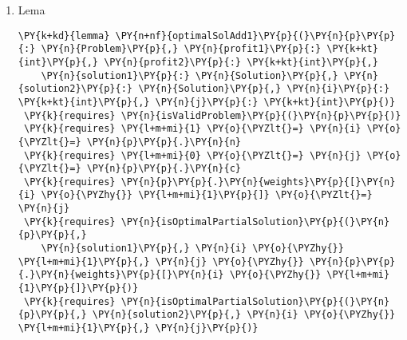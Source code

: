 \begin{sloppypar}
\begin{enumerate}
\begin{Verbatim}[commandchars=\\\{\}]
    \PY{n}{computeGainAllZeros}\PY{p}{(}\PY{n}{p}\PY{p}{,} \PY{n}{solution}\PY{p}{,} \PY{o}{|}\PY{n}{solution}\PY{o}{|} \PY{o}{\PYZhy{}} \PY{l+m+mi}{1}\PY{p}{)}\PY{p}{;}
    \PY{n}{gainCapacity0}\PY{p}{(}\PY{n}{p}\PY{p}{,} \PY{n}{s}\PY{p}{,} \PY{n}{i}\PY{p}{)}\PY{p}{;}
    \PY{k}{assert} \PY{n}{gain}\PY{p}{(}\PY{n}{p}\PY{p}{,} \PY{n}{solution}\PY{p}{)} \PY{o}{==} \PY{l+m+mi}{0}\PY{p}{;}
    \PY{k}{assert} \PY{n}{gain}\PY{p}{(}\PY{n}{p}\PY{p}{,} \PY{n}{s}\PY{p}{)} \PY{o}{==} \PY{l+m+mi}{0}\PY{p}{;}
  \PY{p}{\PYZcb{}}
  \PY{k}{assert} \PY{k}{forall} \PY{n}{s}\PY{p}{:} \PY{n}{Solution} \PY{p}{::} \PY{p}{(}\PY{n}{isPartialSolution}\PY{p}{(}\PY{n}{p}\PY{p}{,} \PY{n}{s}\PY{p}{,} \PY{n}{i}\PY{p}{,} \PY{l+m+mi}{0}\PY{p}{)} \PY{o}{\PYZam{}\PYZam{}} 
   \PY{o}{|}\PY{n}{s}\PY{o}{|} \PY{o}{==} \PY{o}{|}\PY{n}{solution}\PY{o}{|} \PY{o}{==}\PY{o}{\PYZgt{}} \PY{n}{gain}\PY{p}{(}\PY{n}{p}\PY{p}{,} \PY{n}{solution}\PY{p}{)} \PY{o}{\PYZgt{}=} \PY{n}{gain}\PY{p}{(}\PY{n}{p}\PY{p}{,} \PY{n}{s}\PY{p}{)}\PY{p}{)}\PY{p}{;}
  \PY{k}{assert} \PY{n}{isOptimalPartialSolution}\PY{p}{(}\PY{n}{p}\PY{p}{,} \PY{n}{solution}\PY{p}{,} \PY{n}{i}\PY{p}{,} \PY{l+m+mi}{0}\PY{p}{)}\PY{p}{;}
\PY{p}{\PYZcb{}}
\end{Verbatim}
     \item Lema 
     \begin{Verbatim}[commandchars=\\\{\}]
\PY{k+kd}{lemma} \PY{n+nf}{optimalSolAdd1}\PY{p}{(}\PY{n}{p}\PY{p}{:} \PY{n}{Problem}\PY{p}{,} \PY{n}{profit1}\PY{p}{:} \PY{k+kt}{int}\PY{p}{,} \PY{n}{profit2}\PY{p}{:} \PY{k+kt}{int}\PY{p}{,} 
    \PY{n}{solution1}\PY{p}{:} \PY{n}{Solution}\PY{p}{,} \PY{n}{solution2}\PY{p}{:} \PY{n}{Solution}\PY{p}{,} \PY{n}{i}\PY{p}{:} \PY{k+kt}{int}\PY{p}{,} \PY{n}{j}\PY{p}{:} \PY{k+kt}{int}\PY{p}{)}
 \PY{k}{requires} \PY{n}{isValidProblem}\PY{p}{(}\PY{n}{p}\PY{p}{)}
 \PY{k}{requires} \PY{l+m+mi}{1} \PY{o}{\PYZlt{}=} \PY{n}{i} \PY{o}{\PYZlt{}=} \PY{n}{p}\PY{p}{.}\PY{n}{n}
 \PY{k}{requires} \PY{l+m+mi}{0} \PY{o}{\PYZlt{}=} \PY{n}{j} \PY{o}{\PYZlt{}=} \PY{n}{p}\PY{p}{.}\PY{n}{c}
 \PY{k}{requires} \PY{n}{p}\PY{p}{.}\PY{n}{weights}\PY{p}{[}\PY{n}{i} \PY{o}{\PYZhy{}} \PY{l+m+mi}{1}\PY{p}{]} \PY{o}{\PYZlt{}=} \PY{n}{j}
 \PY{k}{requires} \PY{n}{isOptimalPartialSolution}\PY{p}{(}\PY{n}{p}\PY{p}{,} 
    \PY{n}{solution1}\PY{p}{,} \PY{n}{i} \PY{o}{\PYZhy{}} \PY{l+m+mi}{1}\PY{p}{,} \PY{n}{j} \PY{o}{\PYZhy{}} \PY{n}{p}\PY{p}{.}\PY{n}{weights}\PY{p}{[}\PY{n}{i} \PY{o}{\PYZhy{}} \PY{l+m+mi}{1}\PY{p}{]}\PY{p}{)}
 \PY{k}{requires} \PY{n}{isOptimalPartialSolution}\PY{p}{(}\PY{n}{p}\PY{p}{,} \PY{n}{solution2}\PY{p}{,} \PY{n}{i} \PY{o}{\PYZhy{}} \PY{l+m+mi}{1}\PY{p}{,} \PY{n}{j}\PY{p}{)}

\end{Verbatim}
\end{enumerate}
\end{sloppypar}
